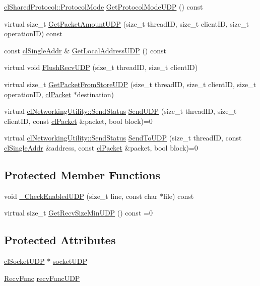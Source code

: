 \begin{DoxyCompactItemize}
\hyperlink{classcl_shared_protocol_a4b0b9c82b8ae4eee78c6308c35afd47b}{clSharedProtocol::ProtocolMode} \hyperlink{classcl_instance_u_d_p_a77861553e70dfd07996bc1434175fdd2}{GetProtocolModeUDP} () const 
\item 
virtual size\_\-t \hyperlink{classcl_instance_u_d_p_a9f636c4f9c4305660ccdadfe6a48eb01}{GetPacketAmountUDP} (size\_\-t threadID, size\_\-t clientID, size\_\-t operationID) const 
\item 
const \hyperlink{classcl_single_addr}{clSingleAddr} \& \hyperlink{classcl_instance_u_d_p_ace4b9cb6e070ae54a9504027e6ca3670}{GetLocalAddressUDP} () const 
\item 
virtual void \hyperlink{classcl_instance_u_d_p_a0d4766b34dde4fcca1f790e30742fcf5}{FlushRecvUDP} (size\_\-t threadID, size\_\-t clientID)
\item 
virtual size\_\-t \hyperlink{classcl_instance_u_d_p_af519100fd9bb7c993396e249002eddb2}{GetPacketFromStoreUDP} (size\_\-t threadID, size\_\-t clientID, size\_\-t operationID, \hyperlink{classcl_packet}{clPacket} $\ast$destination)
\item 
virtual \hyperlink{classcl_networking_utility_a19389cda12603396e03caa9d82073803}{clNetworkingUtility::SendStatus} \hyperlink{classcl_instance_u_d_p_af56fb711b4bf6d5152c68912a3f10f13}{SendUDP} (size\_\-t threadID, size\_\-t clientID, const \hyperlink{classcl_packet}{clPacket} \&packet, bool block)=0
\item 
virtual \hyperlink{classcl_networking_utility_a19389cda12603396e03caa9d82073803}{clNetworkingUtility::SendStatus} \hyperlink{classcl_instance_u_d_p_a2a429c537132c699c920b3deb2b96a43}{SendToUDP} (size\_\-t threadID, const \hyperlink{classcl_single_addr}{clSingleAddr} \&address, const \hyperlink{classcl_packet}{clPacket} \&packet, bool block)=0
\end{DoxyCompactItemize}
\subsection*{Protected Member Functions}
\begin{DoxyCompactItemize}
\item 
void \hyperlink{classcl_instance_u_d_p_a97b3a95fa31ad3a5ef3f331186a2e513}{\_\-CheckEnabledUDP} (size\_\-t line, const char $\ast$file) const 
\item 
virtual size\_\-t \hyperlink{classcl_instance_u_d_p_a180b09957ac5b22a7a298f2615f1d656}{GetRecvSizeMinUDP} () const =0
\end{DoxyCompactItemize}
\subsection*{Protected Attributes}
\begin{DoxyCompactItemize}
\item 
\hyperlink{classcl_socket_u_d_p}{clSocketUDP} $\ast$ \hyperlink{classcl_instance_u_d_p_adabf31cb357eb5dada6ad5c8e57c611e}{socketUDP}
\item 
\hyperlink{classcl_instance_core_afa96c2a2c0b26b6a9256b87798bf9587}{RecvFunc} \hyperlink{classcl_instance_u_d_p_a71fd288aaec92fa83f45060bc15d1f1e}{recvFuncUDP}
\end{DoxyCompactItemize}


